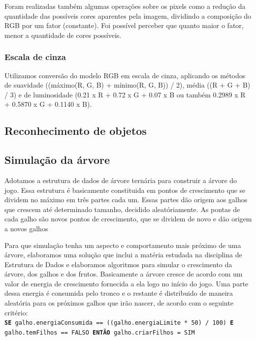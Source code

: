 \documentclass[12pt]{article}
\begin{document}
Foram realizadas tamb\'em algumas opera\c c\~oes sobre os pixels como a redu\c c\~ao da quantidade
das poss\'iveis cores aparentes pela imagem, dividindo a composi\c c\~ao do RGB por um fator (constante).
Foi poss\'ivel perceber que quanto maior o fator, menor a quantidade de cores poss\'iveis.

\subsubsection{Escala de cinza}
Utilizamos convers\~ao do modelo RGB em escala de cinza, aplicando os m\'etodos de suavidade
((m\'aximo(R, G, B) + m\'inimo(R, G, B)) / 2), m\'edia ((R + G + B) / 3) e de luminosidade
(0.21 x R + 0.72 x G + 0.07 x B ou tamb\'em 0.2989 x R + 0.5870 x G + 0.1140 x B).

\subsection{Reconhecimento de objetos}

\subsection{Simula\c c\~ao da \'arvore}

Adotamos a estrutura de dados de \'arvore tern\'aria para construir a \'arvore do jogo. Essa estrutura \'e basicamente constituida
em pontos de crescimento que se dividem no m\'aximo em tr\^es partes cada um. Essas partes d\~ao origem aos galhos que crescem at\'e
determinado tamanho, decidido aleat\'oriamente. As pontas de cada galho s\~ao novos pontos de crescimento,
que se dividem de novo e d\~ao origem a novos galhos

Para que simula\c c\~ao tenha um aspecto e comportamento mais pr\'oximo de uma \'arvore, elaboramos uma solu\c c\~ao que inclui
a mat\'eria estudada na disciplina de Estrutura de Dados e elaboramos algoritmos para simular o crescimento da \'arvore,
dos galhos e dos frutos. Basicamente a \'arvore cresce de acordo com um valor de energia de crescimento fornecida
a ela logo no in\'icio do jogo. Uma parte dessa energia \'e consumida pelo tronco e o restante \'e distribuido
de maneira aleat\'oria para os pr\'oximos galhos que ir\~ao nascer, de acordo com o seguinte crit\'erio: \\

 \texttt{\footnotesize{\textbf{SE} galho.energiaConsumida == ((galho.energiaLimite * 50) / 100) \textbf{E} galho.temFilhos == FALSO 
        \textbf{ENT\~AO} galho.criarFilhos = SIM}} \\
\end{document}
